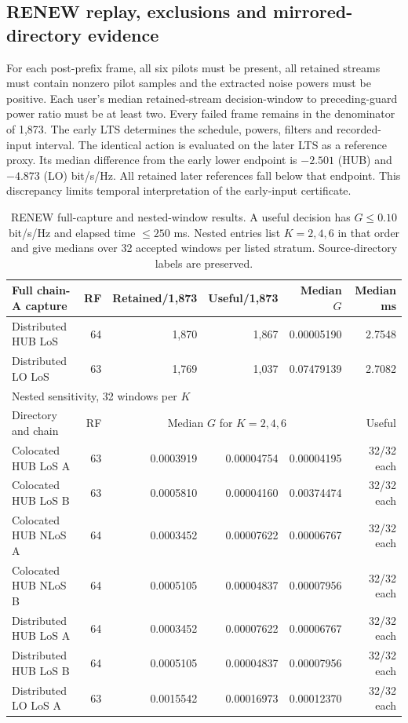\documentclass[10pt,letterpaper]{article}
\begin{document}
\clearpage
\subsection*{RENEW replay, exclusions and mirrored-directory evidence}
For each post-prefix frame, all six pilots must be present, all retained
streams must contain nonzero pilot samples and the extracted noise powers
must be positive. Each user's median retained-stream decision-window to
preceding-guard power ratio must be at least two. Every failed frame remains
in the denominator of 1,873. The early LTS determines the schedule, powers,
filters and recorded-input interval. The identical action is evaluated on
the later LTS as a reference proxy. Its median difference from the early
lower endpoint is $-2.501$ (HUB) and $-4.873$ (LO) bit/s/Hz. All retained
later references fall below that endpoint. This discrepancy limits temporal
interpretation of the early-input certificate.

\begin{table}[htbp]
\centering\small
\caption{RENEW full-capture and nested-window results. A useful decision has
$G\leq0.10$ bit/s/Hz and elapsed time $\leq250$ ms. Nested entries list
$K=2,4,6$ in that order and give medians over 32 accepted windows per listed
stratum. Source-directory labels are preserved.}
\label{supp:table8}
\begin{tabular}{lrrrrr}
\hline
Full chain-A capture & RF & Retained/1,873 & Useful/1,873 & Median $G$ & Median ms\\
\hline
Distributed HUB LoS &64&1,870&1,867&0.00005190&2.7548\\
Distributed LO LoS &63&1,769&1,037&0.07479139&2.7082\\
\hline
\multicolumn{6}{l}{Nested sensitivity, 32 windows per $K$}\\
Directory and chain & RF & \multicolumn{3}{c}{Median $G$ for $K=2,4,6$} & Useful\\
\hline
Colocated HUB LoS A &63&0.0003919&0.00004754&0.00004195&32/32 each\\
Colocated HUB LoS B &63&0.0005810&0.00004160&0.00374474&32/32 each\\
Colocated HUB NLoS A &64&0.0003452&0.00007622&0.00006767&32/32 each\\
Colocated HUB NLoS B &64&0.0005105&0.00004837&0.00007956&32/32 each\\
Distributed HUB LoS A &64&0.0003452&0.00007622&0.00006767&32/32 each\\
Distributed HUB LoS B &64&0.0005105&0.00004837&0.00007956&32/32 each\\
Distributed LO LoS A &63&0.0015542&0.00016973&0.00012370&32/32 each\\
\hline
\end{tabular}
\end{table}
\end{document}
